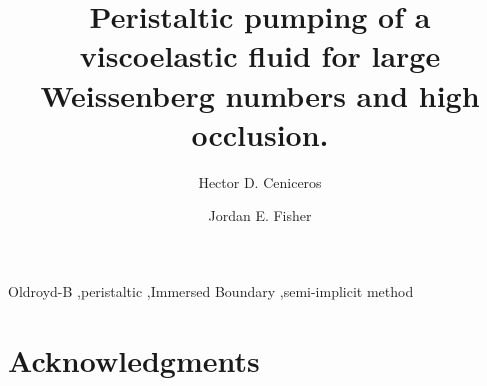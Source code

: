 \documentclass[preprint,12pt]{elsarticle}
\begin{document}
\begin{frontmatter}

\title{Peristaltic pumping of a viscoelastic fluid for large Weissenberg numbers and high occlusion.}

\author{Hector D. Ceniceros}%
\address{Department of Mathematics, University of California Santa Barbara, CA 93106}
\author{Jordan E. Fisher}%
\address{Department of Mathematics, University of California Santa Barbara, CA 93106}

\begin{abstract}

\end{abstract}

\begin{keyword}
Oldroyd-B \sep peristaltic \sep Immersed Boundary \sep semi-implicit method


\end{keyword}

\end{frontmatter}







\section*{Acknowledgments}




\end{document}
